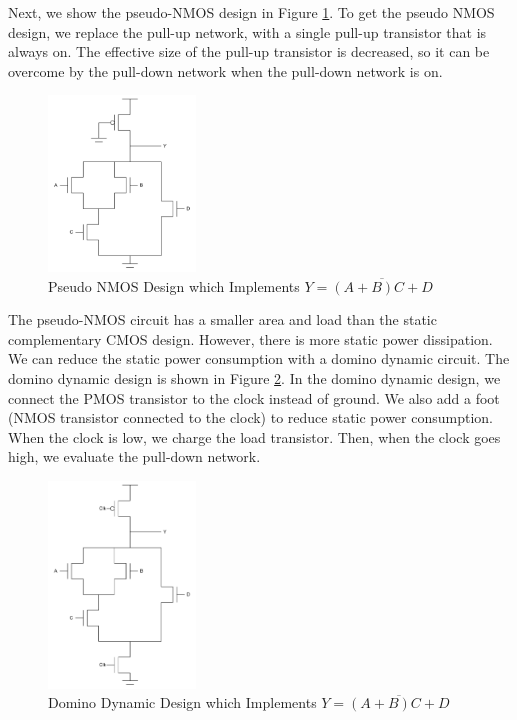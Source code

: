 \documentclass[fleqn]{article}
\begin{document}
\begin{enumerate}
		Next, we show the pseudo-NMOS design in Figure \ref{fig::problem2_pseudo_nmos}. To get the pseudo NMOS design, we replace the pull-up network, with a single pull-up transistor that is always on. The effective size of the pull-up transistor is decreased, so it can be overcome by the pull-down network when the pull-down network is on.
		
		\begin{figure}[H]
			\centerline{\includegraphics[width=0.35\textwidth]{problem2_pseudo_nmos.png}}
			\caption{Pseudo NMOS Design which Implements $Y = \overline{(A + B)C + D}$}
			\label{fig::problem2_pseudo_nmos}
		\end{figure}

		The pseudo-NMOS circuit has a smaller area and load than the static complementary CMOS design. However, there is more static power dissipation. We can reduce the static power consumption with a domino dynamic circuit. The domino dynamic design is shown in Figure \ref{fig::problem2_domino_dynamic}. In the domino dynamic design, we connect the PMOS transistor to the clock instead of ground. We also add a foot (NMOS transistor connected to the clock) to reduce static power consumption. When the clock is low, we charge the load transistor. Then, when the clock goes high, we evaluate the pull-down network.
		
		\begin{figure}[H]
			\centerline{\includegraphics[width=0.35\textwidth]{problem2_domino_dynamic.png}}
			\caption{Domino Dynamic Design which Implements $Y = \overline{(A + B)C + D}$}
			\label{fig::problem2_domino_dynamic}
		\end{figure}


\end{enumerate}
\end{document}
